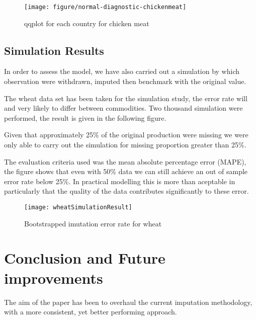 \documentclass[nojss]{jss}\usepackage[]{graphicx}\usepackage[]{color}
\makeatletter
\def\maxwidth{ %
  \ifdim\Gin@nat@width>\linewidth
    \linewidth
  \else
    \Gin@nat@width
  \fi
}
\newenvironment{knitrout}{}{} %
\makeatother
\begin{document}
\begin{knitrout}
\color{fgcolor}\begin{figure}[]


{\centering \texttt{[image: figure/normal-diagnostic-chickenmeat]} 

}

\caption[qqplot for each country for chicken meat]{qqplot for each country for chicken meat\label{fig:normal-diagnostic-chickenmeat}}
\end{figure}


\end{knitrout}



\subsection{Simulation Results}
In order to assess the model, we have also carried out a simulation by
which observation were withdrawn, imputed then benchmark with the
original value.

The wheat data set has been taken for the simulation study, the error
rate will and very likely to differ between commodities. Two thousand
simulation were performed, the result is given in the following
figure.

Given that approximately 25\% of the original production were missing
we were only able to carry out the simulation for missing proportion
greater than 25\%.

The evaluation criteria used was the mean absolute percentage error
(MAPE), the figure shows that even with 50\% data we can still achieve
an out of sample error rate below 25\%. In practical modelling this is
more than aceptable in particularly that the quality of the data
contributes significantly to these error.

\begin{figure}[h!]
  \centering
  \texttt{[image: wheatSimulationResult]}
  \caption{Bootstrapped imutation error rate for wheat}
\end{figure}

\section{Conclusion and Future improvements}
The aim of the paper has been to overhaul the current imputation
methodology, with a more consistent, yet better performing approach.
\end{document}
